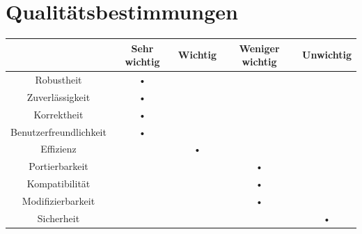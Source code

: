 \documentclass[parskip=full]{scrartcl}
\begin{document}
\section{Qualitätsbestimmungen}
\begin{tabular}{|c|c|c|c|c|}
\hline & Sehr wichtig & Wichtig & Weniger wichtig & Unwichtig \\
\hline Robustheit & • &  &  & \\ 
\hline Zuverlässigkeit & • &  &  & \\ 
\hline Korrektheit & • &  &  & \\ 
\hline Benutzerfreundlichkeit & • &  &  & \\ 
\hline Effizienz &  & • &  & \\ 
\hline Portierbarkeit &  &  & • & \\ 
\hline Kompatibilität &  &  & • & \\ 
\hline Modifizierbarkeit &  &  & • & \\ 
\hline Sicherheit &  &  &  & • \\ 
\hline 
\end{tabular} 
\newpage
\end{document}
